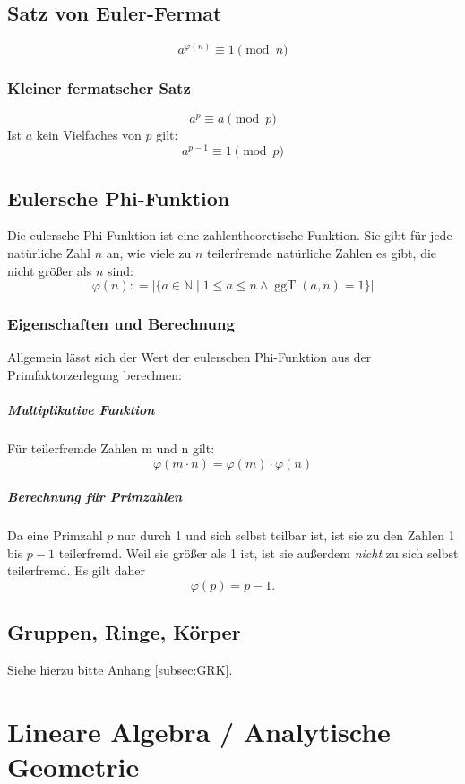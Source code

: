 \documentclass[a4paper,10pt,DIV9, BCOR12mm, oneside,openright,openbib]{scrreprt}
\theoremstyle{definition}
\theoremstyle{plain}
\begin{document}
\section{Satz von Euler-Fermat}
\[a^{\varphi(n)} \equiv 1\pmod{n}\]
\subsection{Kleiner fermatscher Satz}
\[a^p \equiv a\pmod{p}\]
Ist $a$ kein Vielfaches von $p$ gilt:
\[a^{p-1} \equiv 1\pmod{p} \]

\section{Eulersche Phi-Funktion}
Die eulersche Phi-Funktion ist eine zahlentheoretische Funktion. Sie gibt für jede natürliche Zahl $n$ an, wie viele zu $n$ teilerfremde natürliche Zahlen es gibt, die nicht größer als $n$ sind:
\[ \varphi(n) \colon= \Big| \{a \in \mathbb{N} \mid 1 \leq a \leq n \wedge \operatorname{ggT}(a,n) = 1 \} \Big| \]

\subsection{Eigenschaften und Berechnung}
Allgemein lässt sich der Wert der eulerschen Phi-Funktion aus der Primfaktorzerlegung berechnen:
\paragraph{Multiplikative Funktion}
Für teilerfremde Zahlen m und n gilt:
\[\varphi (m \cdot n) = \varphi (m) \cdot \varphi (n) \]
\paragraph{Berechnung für Primzahlen}
Da eine Primzahl $p$ nur durch 1 und sich selbst teilbar ist, ist sie zu den Zahlen 1 bis $p - 1$ teilerfremd. Weil sie größer als 1 ist, ist sie außerdem \textit{nicht} zu sich selbst teilerfremd. Es gilt daher
\[\varphi(p) = p-1. \]

\section{Gruppen, Ringe, Körper}
Siehe hierzu bitte Anhang \vref{subsec:GRK}.


\chapter{Lineare Algebra / Analytische Geometrie} 
\end{document}
